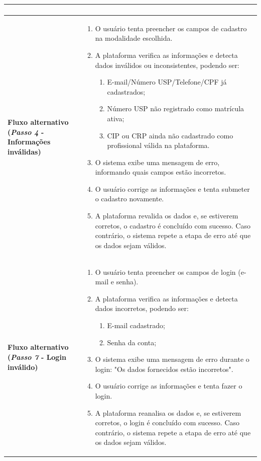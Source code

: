 \documentclass[a4paper,12pt]{report}
\begin{document}
\begin{longtable}{|p{4cm}|p{11.5cm}|}
\begin{enumerate}[leftmargin=*,labelsep=1em]
    \end{enumerate} \\ \hline
    \hline\textbf{Fluxo alternativo (\textit{Passo 4} - Informações inválidas)} & 
    \begin{enumerate}[leftmargin=*,labelsep=1em]
        \item O usuário tenta preencher os campos de cadastro na modalidade escolhida.
        \item A plataforma verifica as informações e detecta dados inválidos ou inconsistentes, podendo ser:
        \begin{enumerate}
            \item E-mail/Número USP/Telefone/CPF já cadastrados;
            \item Número USP não registrado como matrícula ativa;
            \item CIP ou CRP ainda não cadastrado como profissional válida na plataforma.
        \end{enumerate}
        \item O sistema exibe uma mensagem de erro, informando quais campos estão incorretos.
        \item O usuário corrige as informações e tenta submeter o cadastro novamente.
        \item A plataforma revalida os dados e, se estiverem corretos, o cadastro é concluído com sucesso. Caso contrário, o sistema repete a etapa de erro até que os dados sejam válidos.
    \end{enumerate} \\ \hline
    \textbf{Fluxo alternativo (\textit{Passo 7} - Login inválido)} & 
    \begin{enumerate}[leftmargin=*,labelsep=1em]
        \item O usuário tenta preencher os campos de login (e-mail e senha).
        \item A plataforma verifica as informações e detecta dados incorretos, podendo ser:
        \begin{enumerate}
            \item E-mail cadastrado;
            \item Senha da conta;
        \end{enumerate}
        \item O sistema exibe uma mensagem de erro durante o login: "Os dados fornecidos estão incorretos".
        \item O usuário corrige as informações e tenta fazer o login.
        \item A plataforma reanalisa os dados e, se estiverem corretos, o login é concluído com sucesso. Caso contrário, o sistema repete a etapa de erro até que os dados sejam válidos.
    \end{enumerate} \\ \hline
\end{longtable}
\end{document}
